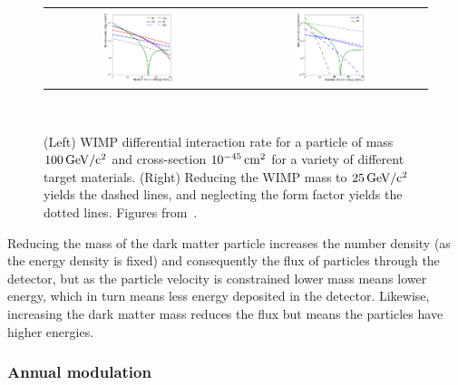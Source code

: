 \begin{figure}[htb]
    \begin{tabular}{cc}
    \includegraphics[width=0.4\textwidth]{figures/dm/rate_comp_v03} & \includegraphics[width=0.4\textwidth]{figures/dm/rate_var_vs01} \\
    \end{tabular}
    \caption{(Left) WIMP differential interaction rate for a particle of mass $100\,\mathrm{GeV/c^2}$ and cross-section $10^{-45}\,\mathrm{cm^2}$ for a variety of different target materials. (Right) Reducing the WIMP mass to $25\,\mathrm{GeV/c^2}$ yields the dashed lines, and neglecting the form factor yields the dotted lines. Figures from~\cite{Undagoitia:2015gya}.}~\label{fig:dm_rate}
\end{figure}

Reducing the mass of the dark matter particle increases the number density (as the energy density is fixed) and consequently the flux of particles through the detector, but as the particle velocity is constrained lower mass means lower energy, which in turn means less energy deposited in the detector. Likewise, increasing the dark matter mass reduces the flux but means the particles have higher energies.

\subsubsection{Annual modulation}

